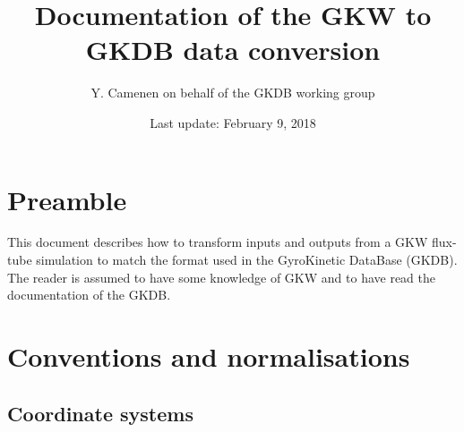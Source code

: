 \documentclass[a4paper]{report}
\begin{document}
\title{Documentation of the GKW to GKDB data conversion}

\author{Y. Camenen on behalf of the GKDB working group}

\date{Last update: February 9, 2018}

\maketitle

\chapter{Preamble}
This document describes how to transform inputs and outputs from a GKW flux-tube simulation to match the format used in the GyroKinetic DataBase (GKDB). \\ 
The reader is assumed to have some knowledge of GKW and to have read the documentation of the GKDB.

\tableofcontents

\chapter{Conventions and normalisations}

\section{Coordinate systems}
\end{document}

